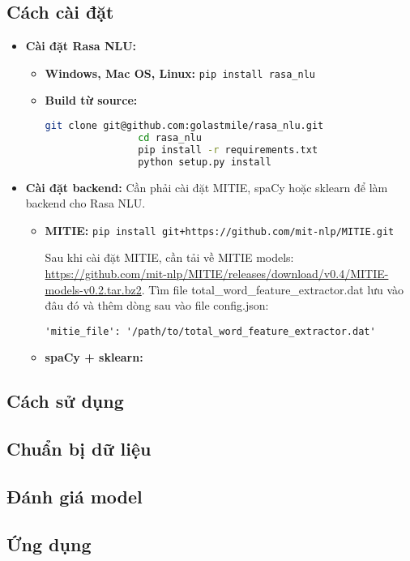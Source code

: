 \subsection{Cách cài đặt}

\begin{itemize}
    \item \textbf{Cài đặt Rasa NLU:}
    \begin{itemize}
        \item \textbf{Windows, Mac OS, Linux:} \lstinline[language=bash]{pip install rasa_nlu}
        \item \textbf{Build từ source:}
            \begin{lstlisting}[language=bash]
                git clone git@github.com:golastmile/rasa_nlu.git
                cd rasa_nlu
                pip install -r requirements.txt
                python setup.py install
            \end{lstlisting}
    \end{itemize}
    
    \item \textbf{Cài đặt backend:} Cần phải cài đặt MITIE, spaCy hoặc sklearn để làm backend cho Rasa NLU.
    \begin{itemize}
        \item \textbf{MITIE:} \lstinline[language=bash]{pip install git+https://github.com/mit-nlp/MITIE.git}
        
        Sau khi cài đặt MITIE, cần tải về MITIE models: \url{https://github.com/mit-nlp/MITIE/releases/download/v0.4/MITIE-models-v0.2.tar.bz2}. Tìm file total\_word\_feature\_extractor.dat lưu vào đâu đó và thêm dòng sau vào file config.json:
        
        \lstinline{'mitie_file': '/path/to/total_word_feature_extractor.dat'}
        
        \item \textbf{spaCy + sklearn:}
    \end{itemize}
\end{itemize}

\subsection{Cách sử dụng}

\subsection{Chuẩn bị dữ liệu}

\subsection{Đánh giá model}

\subsection{Ứng dụng}
